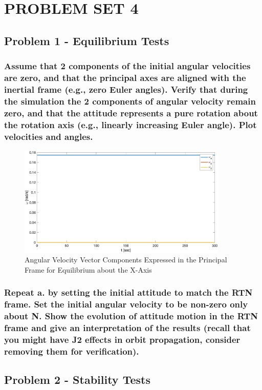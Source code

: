 \section{\Large PROBLEM SET 4}

\subsection{Problem 1 - Equilibrium Tests}

\subsubsection{Assume that 2 components of the initial angular velocities are zero, and that the principal axes are
aligned with the inertial frame (e.g., zero Euler angles). Verify that during the simulation the 2
components of angular velocity remain zero, and that the attitude represents a pure rotation about
the rotation axis (e.g., linearly increasing Euler angle). Plot velocities and angles.}

\begin{figure}[H]
    \centering
    \captionsetup{justification = centering}
    \includegraphics[width = 10cm]{Images/PS4/equilibrium_inertial_velocities.png}
    \caption{Angular Velocity Vector Components Expressed in the Principal Frame for Equilibrium about the X-Axis}
    \label{fig:inertial_equilibrium}
\end{figure}

\subsubsection{Repeat a. by setting the initial attitude to match the RTN frame. Set the initial angular velocity to
be non-zero only about N. Show the evolution of attitude motion in the RTN frame and give an
interpretation of the results (recall that you might have J2 effects in orbit propagation, consider
removing them for verification).}

\subsection{Problem 2 - Stability Tests}

